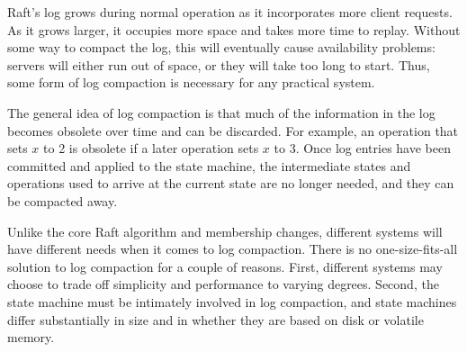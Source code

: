 
Raft's log grows during normal operation as it incorporates more client
requests. As it grows larger, it occupies more space and takes more time
to replay. Without some way to compact the log, this will eventually
cause availability problems: servers will either run out of space, or
they will take too long to start. Thus, some form of log compaction is
necessary for any practical system.

The general idea of log compaction is that much of the information in
the log becomes obsolete over time and can be discarded. For example, an
operation that sets $x$ to 2 is obsolete if a later operation sets $x$
to 3. Once log entries have been committed and applied to the
state machine, the intermediate states and operations used to arrive at
the current state are no longer needed, and they can be compacted away.

Unlike the core Raft algorithm and membership changes, different systems
will have different needs when it comes to log compaction. There is no
one-size-fits-all solution to log compaction for a couple of reasons.
First, different systems may choose to trade off simplicity and
performance to varying degrees. Second, the state machine must be
intimately involved in log compaction, and state machines differ
substantially in size and in whether they are based on disk or volatile memory.


